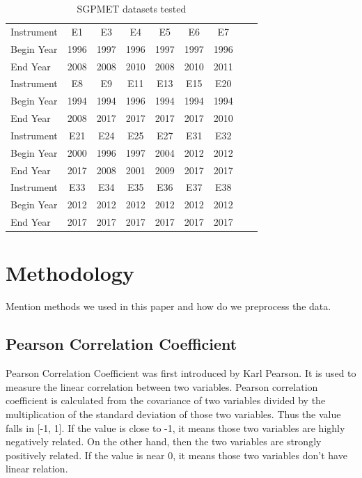 \documentclass[letterpaper, 10 pt, conference]{ieeeconf}  %
\begin{document}
\begin{table}[ht]
\caption{SGPMET datasets tested}
\label{tab:datasets}
\centering
\begin{tabular}{|l|c|c|c|c|c|c|c|c|}
\hline
Instrument & E1 & E3 & E4 & E5 & E6 & E7\\
Begin Year & 1996 & 1997 & 1996 & 1997 & 1997 & 1996\\
End Year & 2008 & 2008 & 2010 & 2008 & 2010 & 2011\\
\hline
Instrument & E8 & E9 & E11 & E13 & E15 & E20\\
Begin Year & 1994 & 1994 & 1996 & 1994 & 1994 & 1994\\
End Year & 2008 & 2017 & 2017 & 2017 & 2017 & 2010\\
\hline
Instrument & E21 & E24 & E25 & E27 & E31 & E32\\
Begin Year & 2000 & 1996 & 1997 & 2004 & 2012 & 2012\\
End Year & 2017 & 2008 & 2001 & 2009 & 2017 & 2017\\
\hline
Instrument & E33 & E34 & E35 & E36 & E37 & E38\\
Begin Year & 2012 & 2012 & 2012 & 2012 & 2012 & 2012\\
End Year & 2017 & 2017 & 2017 & 2017 & 2017 & 2017\\
\hline
\end{tabular}
\end{table}

\section{Methodology}
Mention methods we used in this paper and how do we preprocess the data. 

\subsection{Pearson Correlation Coefficient} 
Pearson Correlation Coefficient was first introduced by Karl Pearson\cite{pearson1895note}. It is used to measure the linear correlation between two variables. Pearson correlation coefficient is calculated from the covariance of two variables divided by the multiplication of the standard deviation of those two variables. Thus the value falls in [-1, 1]. If the value is close to -1, it means those two variables are highly negatively related. On the other hand, then the two variables are strongly positively related. If the value is near 0, it means those two variables don't have linear relation. 
\end{document}
